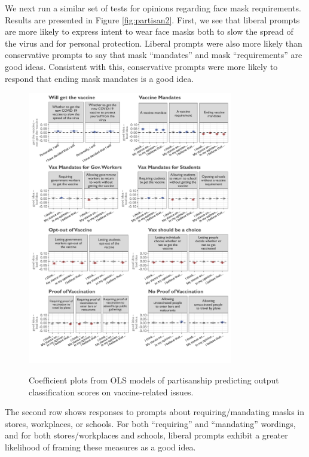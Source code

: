 \documentclass{article} %
\begin{document}
We next run a similar set of tests for opinions regarding face mask
requirements. Results are presented in Figure \ref{fig:partisan2}. First, we see that
liberal prompts are more likely to express intent to wear face masks
both to slow the spread of the virus and for personal protection.
Liberal prompts were also more likely than conservative prompts to say
that mask ``mandates'' and mask ``requirements'' are good ideas.
Consistent with this, conservative prompts were more likely to respond
that ending mask mandates is a good idea.

\begin{figure}[!htbp]
  \captionsetup{justification=raggedright,singlelinecheck=false}
  \caption{Coefficient plots from OLS models of partisanship predicting output classification scores on vaccine-related issues.}
  \centering
  \includegraphics[width=0.8\textwidth, height=\textheight, keepaspectratio]{./figures/media/image12.png}
  \label{fig:coefplot}
\end{figure}

The second row shows responses to prompts about requiring/mandating
masks in stores, workplaces, or schools. For both ``requiring'' and
``mandating'' wordings, and for both stores/workplaces and schools,
liberal prompts exhibit a greater likelihood of framing these measures
as a good idea.
\end{document}
